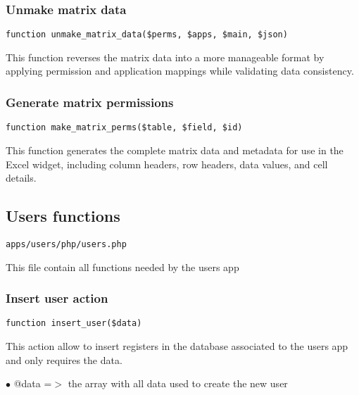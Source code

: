 \documentclass[a4paper]{article}
\begin{document}
\hypertarget{toc190}{}
\subsubsection{Unmake matrix data}

\begin{lstlisting}
function unmake_matrix_data($perms, $apps, $main, $json)
\end{lstlisting}

This function reverses the matrix data into a more manageable format by applying
permission and application mappings while validating data consistency.

\hypertarget{toc191}{}
\subsubsection{Generate matrix permissions}

\begin{lstlisting}
function make_matrix_perms($table, $field, $id)
\end{lstlisting}

This function generates the complete matrix data and metadata for use in
the Excel widget, including column headers, row headers, data values, and cell details.

\hypertarget{toc192}{}
\subsection{Users functions}

\begin{lstlisting}
apps/users/php/users.php
\end{lstlisting}

This file contain all functions needed by the users app

\hypertarget{toc193}{}
\subsubsection{Insert user action}

\begin{lstlisting}
function insert_user($data)
\end{lstlisting}

This action allow to insert registers in the database associated to
the users app and only requires the data.

\begin{compactitem}
\item[\color{myblue}$\bullet$] @data =$>$ the array with all data used to create the new user
\end{compactitem}
\end{document}
